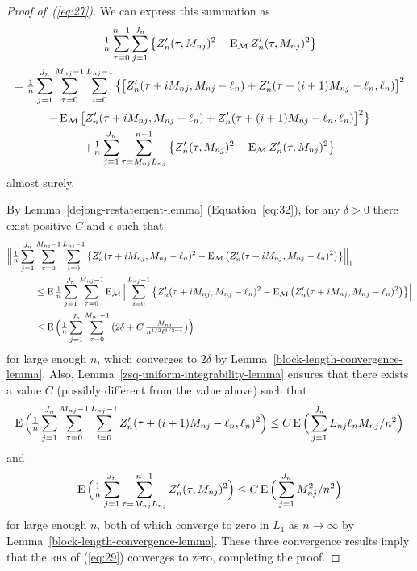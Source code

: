 \documentclass[11pt]{article}
\begin{document}
\begin{proof}[Proof of~(\ref{eq:27})]
  We can express this summation as
  \begin{multline}\label{eq:29}
    \tfrac{1}{n} \sum_{\tau=0}^{n-1}  \sum_{j=1}^{J_n}
    \big\{Z_n'(\tau, M_{nj})^2 - \operatorname{E}_{\mathcal{M}} Z_n'(\tau, M_{nj})^2 \big\}
    \\ =
    \tfrac{1}{n} \sum_{j=1}^{J_n} \sum_{\tau=0}^{M_{nj}-1}
    \sum_{i=0}^{L_{nj}-1}\big\{\big[ Z_n'(\tau + i M_{nj}, M_{nj} - \ell_n) + Z_n'(\tau + (i+1) M_{nj} - \ell_n, \ell_n)\big]^2 \\
    - \operatorname{E}_{\mathcal{M}}\big[ Z_n'(\tau + i M_{nj}, M_{nj} - \ell_n) + Z_n'(\tau + (i+1) M_{nj} - \ell_n, \ell_n)\big]^2 \big\} \\
    + \tfrac{1}{n} \sum_{j=1}^{J_n} \sum_{\tau= M_{nj}L_{nj}}^{n-1}
    \big\{Z_{n}'(\tau, M_{nj})^2 - \operatorname{E}_{\mathcal{M}} Z_n'(\tau, M_{nj})^2 \big\}
  \end{multline}
  almost surely.

  By Lemma~\ref{dejong-restatement-lemma} (Equation~\ref{eq:32}), for
  any $\delta > 0$ there exist positive $C$ and $\epsilon$ such that
  \begin{align*}
    \Big\lVert\tfrac{1}{n} \sum_{j=1}^{J_n} & \sum_{\tau=0}^{M_{nj}-1}
    \sum_{i=0}^{L_{nj}-1} \big\{ Z_n'(\tau + i M_{nj}, M_{nj} - \ell_n)^2 -
    \operatorname{E}_{\mathcal{M}} \big(Z_n'(\tau + i M_{nj}, M_{nj} - \ell_n)^2\big) \big\}\Big\rVert_1 \\
    &\leq \operatorname{E} \tfrac{1}{n} \sum_{j=1}^{J_n} \sum_{\tau=0}^{M_{nj}-1}
    \operatorname{E}_{\mathcal{M}} \Big| \sum_{i=0}^{L_{nj}-1} \big\{ Z_n'(\tau + i M_{nj}, M_{nj} - \ell_n)^2 -
    \operatorname{E}_{\mathcal{M}} \big(Z_n'(\tau + i M_{nj}, M_{nj} - \ell_n)^2\big) \big\} \Big|\\
    &\leq \operatorname{E} \Big(\tfrac{1}{n} \sum_{j=1}^{J_n} \sum_{\tau=0}^{M_{nj}-1} 
    \big(2 \delta + C \, \tfrac{M_{nj}}{n^{1/2} \ell^{1/2+\epsilon}}\big)\Big)
  \end{align*}
  for large enough $n$, which converges to $2 \delta$ by
  Lemma~\ref{block-length-convergence-lemma}. Also,
  Lemma~\ref{zsq-uniform-integrability-lemma} ensures that there
  exists a value $C$ (possibly different from the value above) such
  that
  \begin{equation*}
    \operatorname{E}\Big(\tfrac{1}{n}  \sum_{j=1}^{J_n} \sum_{\tau=0}^{M_{nj}-1} \sum_{i=0}^{L_{nj}-1}
    Z_n'(\tau + (i+1) M_{nj} - \ell_n, \ell_n)^2 \Big)
    \leq C \operatorname{E} \Big(\sum_{j=1}^{J_n} L_{nj} \ell_n M_{nj} / n^2\Big)
  \end{equation*}
  and
  \begin{equation*}
    \operatorname{E} \Big(\tfrac{1}{n} \sum_{j=1}^{J_n} \sum_{\tau= M_{nj}L_{nj}}^{n-1} Z_{n}'(\tau, M_{nj})^2\Big)
    \leq
    C \operatorname{E} \Big(\sum_{j=1}^{J_n} M_{nj}^2 / n^2 \Big)
  \end{equation*}
  for large enough $n$, both of which converge to zero in $L_1$ as $n
  \to \infty$ by Lemma~\ref{block-length-convergence-lemma}.  These
  three convergence results imply that the \textsc{rhs} of
  (\ref{eq:29}) converges to zero, completing the proof.
\end{proof}
\end{document}
